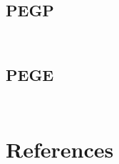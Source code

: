 \documentclass[a4paper,notitlepage]{article}
\newcommand{\sourcecode}[3]{%
\inputminted[linenos=true,tabsize=4,fontsize=\small,frame=lines,framesep=2mm]{c}{#1/#2}
\inputminted[linenos=true,tabsize=4,fontsize=\small,frame=lines,framesep=2mm]{c}{#1/#3}
}
\begin{document}
\subsection{PEGP}
\sourcecode{../Algorithms/PredEvalGlobalPeriodic}{pegp.h}{pegp.c}

\subsection{PEGE}
\sourcecode{../Algorithms/PredEvalGlobalEvent}{pege.h}{pege.c}


\newpage


\section{References}
\renewcommand{\refname}{\vspace{-1cm}}


\end{document}
